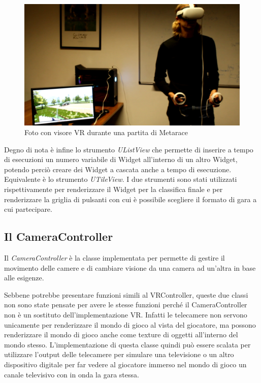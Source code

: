     \begin{figure}[b]
        \centering
        \includegraphics[width=.9\textwidth]{figure/FotoConIlVR.png}
        \caption{Foto con visore VR durante una partita di Metarace}
    \end{figure}

    Degno di nota è infine lo strumento \textit{UListView} che permette di inserire a tempo di esecuzioni un numero variabile di Widget all'interno di un altro Widget, potendo perciò creare dei Widget a cascata anche a tempo di esecuzione.
    Equivalente è lo strumento \textit{UTileView}.
    I due strumenti sono stati utilizzati rispettivamente per renderizzare il Widget per la classifica finale e per renderizzare la griglia di pulsanti con cui è possibile scegliere il formato di gara a cui partecipare.

    \subsection{Il {CameraController}}

    Il \textit{CameraController} è la classe implementata per permette di gestire il movimento delle camere e di cambiare visione da una camera ad un'altra in base alle esigenze.
    
    Sebbene potrebbe presentare funzioni simili al VRController, queste due classi non sono state pensate per avere le stesse funzioni perché il CameraController non è un sostituto dell'implementazione VR.
    Infatti le telecamere non servono unicamente per renderizzare il mondo di gioco al vista del giocatore, ma possono renderizzare il mondo di gioco anche come texture di oggetti all'interno del mondo stesso.
    L'implementazione di questa classe quindi può essere scalata per utilizzare l'output delle telecamere per simulare una televisione o un altro dispositivo digitale per far vedere al giocatore immerso nel mondo di gioco un canale televisivo con in onda la gara stessa.

